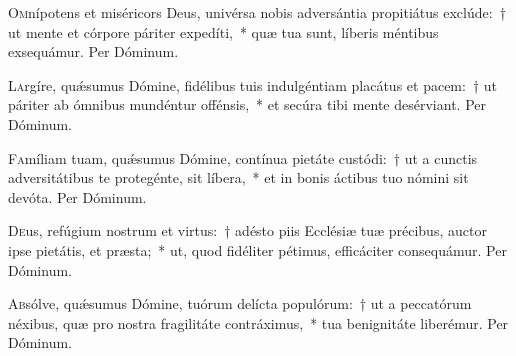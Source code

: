 \documentclass[vesperale_romanum.tex]{subfiles}
\begin{document}
\lettrine{O}{m}nípotens et miséricors Deus, univérsa nobis adversántia propitiátus exclúde:~† ut mente et córpore páriter expedíti,~* quæ tua sunt, líberis méntibus exsequámur. Per Dóminum.



\oratio

\lettrine{L}{a}rgíre, quǽsumus Dómine, fidélibus tuis indulgéntiam placátus et pacem:~† ut páriter ab ómnibus mundéntur offénsis,~* et secúra tibi mente desérviant. Per Dóminum.



\oratio

\lettrine{F}{a}míliam tuam, quǽsumus Dómine, contínua pietáte custódi:~† ut a cunctis adversitátibus te protegénte, sit líbera,~* et in bonis áctibus tuo nómini sit devóta. Per Dóminum.



\oratio

\lettrine{D}{e}us, refúgium nostrum et virtus:~† adésto piis Ecclésiæ tuæ précibus, auctor ipse pietátis, et præsta;~* ut, quod fidéliter pétimus, efficáciter consequámur. Per Dóminum.




\oratio

\lettrine{A}{b}sólve, quǽsumus Dómine, tuórum delícta populórum:~† ut a peccatórum néxibus, quæ pro nostra fragilitáte contráximus,~* tua benignitáte liberémur. Per Dóminum.

\end{document}
